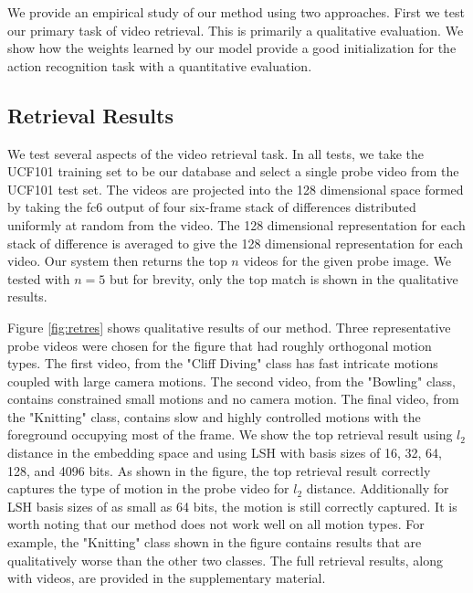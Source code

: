 We provide an empirical study of our method using two approaches. First we test our primary task of video retrieval. This is primarily a qualitative evaluation. We show how the weights learned by our model provide a good initialization for the action recognition task with a quantitative evaluation.

\subsection{Retrieval Results}

We test several aspects of the video retrieval task. In all tests, we take the UCF101 \cite{soomro2012ucf101} training set to be our database and select a single probe video from the UCF101 test set. The videos are projected into the 128 dimensional space formed by taking the fc6 output of four six-frame stack of differences distributed uniformly at random from the video. The 128 dimensional representation for each stack of difference is averaged to give the 128 dimensional representation for each video. Our system then returns the top $n$ videos for the given probe image. We tested with $n=5$ but for brevity, only the top match is shown in the qualitative results.

Figure \ref{fig:retres} shows qualitative results of our method. Three representative probe videos were chosen for the figure that had roughly orthogonal motion types. The first video, from the "Cliff Diving" class has fast intricate motions coupled with large camera motions. The second video, from the "Bowling" class, contains constrained small motions and no camera motion. The final video, from the "Knitting" class, contains slow and highly controlled motions with the foreground occupying most of the frame. We show the top retrieval result using $l_2$ distance in the embedding space and using LSH with basis sizes of 16, 32, 64, 128, and 4096 bits. As shown in the figure, the top retrieval result correctly captures the type of motion in the probe video for $l_2$ distance. Additionally for LSH basis sizes of as small as 64 bits, the motion is still correctly captured. It is worth noting that our method does not work well on all motion types. For example, the "Knitting" class shown in the figure contains results that are qualitatively worse than the other two classes. The full retrieval results, along with videos, are provided in the supplementary material.

